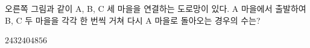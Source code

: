 \noindent\begin{minipage}[t]{0.58\linewidth}\vspace{0pt}\raggedright 오른쪽 그림과 같이 A, B, C 세 마을을 연결하는 도로망이 있다. A 마을에서 출발하여 B, C 두 마을을 각각 한 번씩 거쳐 다시 A 마을로 돌아오는 경우의 수는?\end{minipage}\hfill\begin{minipage}[t]{0.4\linewidth}\vspace{0pt}\centering \resizebox{\ifdim\width>\linewidth\linewidth\else\width\fi}{!}{}\end{minipage}\par
\begin{choices32}{$24$}{$32$}{$40$}{$48$}{$56$}\end{choices32}
